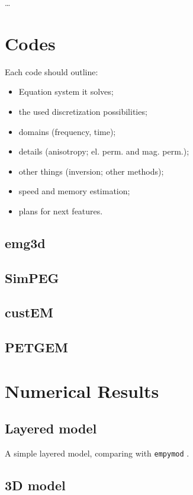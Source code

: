 \documentclass[paper,twocolumn,twoside]{geophysics}
\begin{document}
\dots

\section{Codes}

Each code should outline:
\begin{itemize}
  \item Equation system it solves;
  \item the used discretization possibilities;
  \item domains (frequency, time);
  \item details (anisotropy; el. perm. and mag. perm.);
  \item other things (inversion; other methods);
  \item speed and memory estimation;
  \item plans for next features.
\end{itemize}

\subsection{emg3d}

\subsection{SimPEG}

\subsection{custEM}

\subsection{PETGEM}

\section{Numerical Results}

\subsection{Layered model}

A simple layered model, comparing with \texttt{empymod}
\citep{GEO.17.Werthmuller}.

\subsection{3D model}
\end{document}
